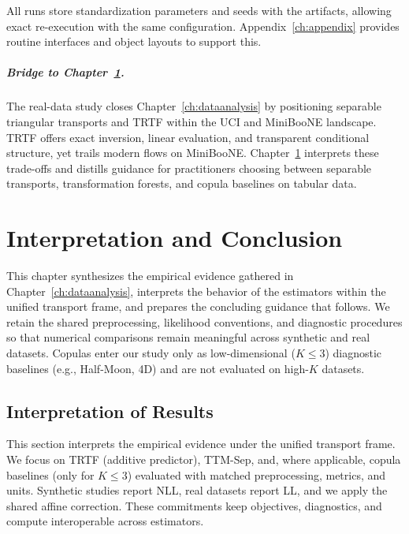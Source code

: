 \documentclass[11pt,a4paper,twoside]{book}\usepackage[]{graphicx}\usepackage[]{xcolor}
\begin{document}
All runs store standardization parameters and seeds with the artifacts, allowing exact re-execution with the same configuration. Appendix~\ref{ch:appendix} provides routine interfaces and object layouts to support this.

\paragraph{Bridge to Chapter~\ref{ch:conclusion}.} The real-data study closes Chapter~\ref{ch:dataanalysis} by positioning separable triangular transports and TRTF within the UCI and MiniBooNE landscape. TRTF offers exact inversion, linear evaluation, and transparent conditional structure, yet trails modern flows on MiniBooNE. Chapter~\ref{ch:conclusion} interprets these trade-offs and distills guidance for practitioners choosing between separable transports, transformation forests, and copula baselines on tabular data.





\chapter{Interpretation and Conclusion}\label{ch:conclusion}

This chapter synthesizes the empirical evidence gathered in Chapter~\ref{ch:dataanalysis}, interprets the behavior of the estimators within the unified transport frame, and prepares the concluding guidance that follows. We retain the shared preprocessing, likelihood conventions, and diagnostic procedures so that numerical comparisons remain meaningful across synthetic and real datasets. Copulas enter our study only as low-dimensional ($K\!\le\!3$) diagnostic baselines (e.g., Half-Moon, 4D) and are not evaluated on high-$K$ datasets.

\section{Interpretation of Results}\label{sec:interpretation-results}
This section interprets the empirical evidence under the unified transport frame. We focus on TRTF (additive predictor), TTM-Sep, and, where applicable, copula baselines (only for $K\!\le\!3$) evaluated with matched preprocessing, metrics, and units. Synthetic studies report NLL, real datasets report LL, and we apply the shared affine correction. These commitments keep objectives, diagnostics, and compute interoperable across estimators.
\end{document}
